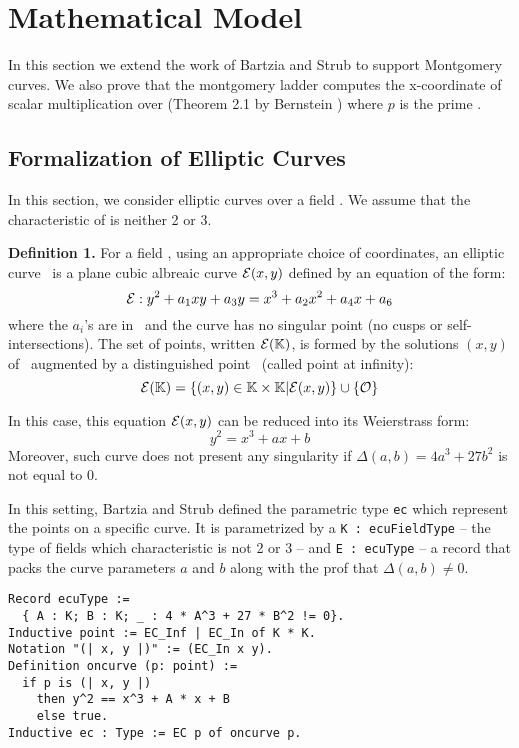 \section{Mathematical Model}

In this section we extend the work of Bartzia and Strub \cite{DBLP:conf/itp/BartziaS14}
to support Montgomery curves. We also prove that the montgomery ladder computes
the x-coordinate of scalar multiplication over 
(Theorem 2.1 by Bernstein \cite{Ber06}) where $p$ is the prime \p.

\subsection{Formalization of Elliptic Curves}

In this section, we consider elliptic curves over a field \K. We assume that the
characteristic of \K is neither 2 or 3.

\textbf{Definition 1.}
For a field \K, using an appropriate choice of coordinates, an elliptic curve \E\
is a plane cubic albreaic curve $\mathcal{E}(x,y)$ defined by an equation of the form:
$$\mathcal{E} : y^2 + a_1 xy + a_3 y = x^3 + a_2 x^2 + a_4 x + a_6$$
where the $a_i$'s are in \K\ and the curve has no singular point (\ie no cusps
or self-intersections). The set of points, written $\mathcal{E}(\mathbb{K})$, is formed by the
solutions $(x,y)$ of \E\ augmented by a distinguished point \Oinf\ (called point at infinity):
$$\mathcal{E}(\mathbb{K}) = \{(x,y) \in \mathbb{K} \times \mathbb{K} | \mathcal{E}(x,y)\} \cup \{\mathcal{O}\}$$

In this case, this equation $\mathcal{E}(x,y)$ can be reduced into its Weierstrass form:
$$y^2 = x^3 + ax + b$$
Moreover, such curve does not present any singularity if
$\Delta(a,b) = 4a^3 + 27b^2$ is not equal to $0$.

In this setting, Bartzia and Strub defined the parametric type \texttt{ec} which
represent the points on a specific curve. It is parametrized by
a \texttt{K : ecuFieldType} -- the type of fields which characteristic is not 2 or 3 --
and \texttt{E : ecuType} -- a record that packs the curve parameters $a$ and $b$
along with the prof that $\Delta(a,b) \neq 0$.

\begin{lstlisting}[language=Coq]
Record ecuType :=
  { A : K; B : K; _ : 4 * A^3 + 27 * B^2 != 0}.
Inductive point := EC_Inf | EC_In of K * K.
Notation "(| x, y |)" := (EC_In x y).
Definition oncurve (p: point) :=
  if p is (| x, y |)
    then y^2 == x^3 + A * x + B
    else true.
Inductive ec : Type := EC p of oncurve p.
\end{lstlisting}

